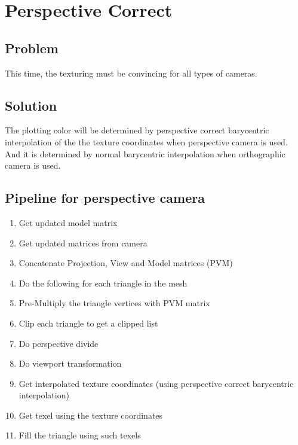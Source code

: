 \section{Perspective Correct}
\subsection{Problem}
This time, the texturing must be convincing for all types of cameras.

\subsection{Solution}
The plotting color will be determined by perspective correct barycentric interpolation of the the texture coordinates when perspective camera is used. And it is determined by normal barycentric interpolation when orthographic camera is used.

\subsection{Pipeline for perspective camera}
\begin{enumerate}
    \item Get updated model matrix
    \item Get updated matrices from camera
    \item Concatenate Projection, View and Model matrices (PVM)
    \item Do the following for each triangle in the mesh
	\item Pre-Multiply the triangle vertices with PVM matrix
	\item Clip each triangle to get a clipped list
	\item Do perspective divide
	\item Do viewport transformation
	\item Get interpolated texture coordinates (using perspective correct barycentric interpolation)
	\item Get texel using the texture coordinates
	\item Fill the triangle using such texels
\end{enumerate}

